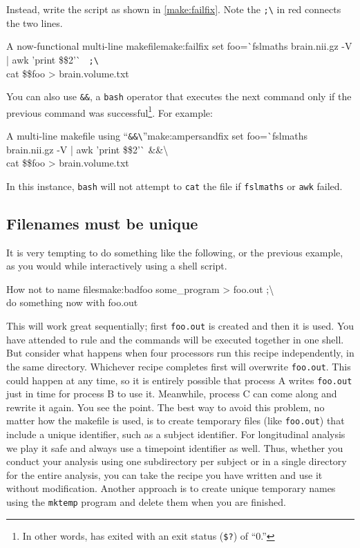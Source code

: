 Instead, write the script as shown in \autoref{make:failfix}. Note the \texttt{;\textbackslash} in red connects the two lines.
\begin{make}{A now-functional multi-line makefile}{make:failfix}
	set foo=\`{}fslmaths brain.nii.gz -V | awk '{print \$\$2}'\`{} \texttt{{\color{red} ;\textbackslash}} \\
	cat \$\$foo > brain.volume.txt
\end{make}

You can also use \texttt{\&\&}, a \texttt{bash} operator that executes the next command only if the previous command was successful\footnote{In other words, has exited with an exit status (\texttt{\$?}) of ``0.''}. For example:
\begin{make}{A multi-line makefile using ``\texttt{\&\&\textbackslash}''}{make:ampersandfix}
	set foo=\`{}fslmaths brain.nii.gz -V | awk '{print \$\$2}'\`{} \&\&\textbackslash\\
	cat \$\$foo > brain.volume.txt
\end{make}

In this instance, \texttt{bash} will not attempt to \texttt{cat} the file if \texttt{fslmaths} or \texttt{awk} failed.

\subsection{Filenames must be unique}

It is very tempting to do something like the following, or the previous example, as  you would while interactively using a shell script.
\begin{make}{How not to name files}{make:badfoo}
	some_program > foo.out ;\textbackslash \\
	do something \dd now \dd with foo.out
\end{make}

This will work great sequentially; first \texttt{foo.out} is created and then it is used. You have attended to rule  and the commands will be executed together in one shell. But consider what happens when four processors run this recipe independently, in the same directory. Whichever recipe completes first will overwrite \texttt{foo.out}. This could happen at any time, so it is entirely possible that process A writes \texttt{foo.out} just in time for process B to use it. Meanwhile, process C can come along and rewrite it again. You see the point. The best way to avoid this problem, no matter how the makefile is used, is to create temporary files (like \texttt{foo.out}) that include a unique identifier, such as a subject identifier. For longitudinal analysis we play it safe and always use a timepoint identifier as well. Thus, whether you conduct your analysis using one subdirectory per subject or in a single directory for the entire analysis, you can take the recipe you have written and use it without modification. Another approach is to create unique temporary names using the \texttt{mktemp} program and delete them when you are finished. 

